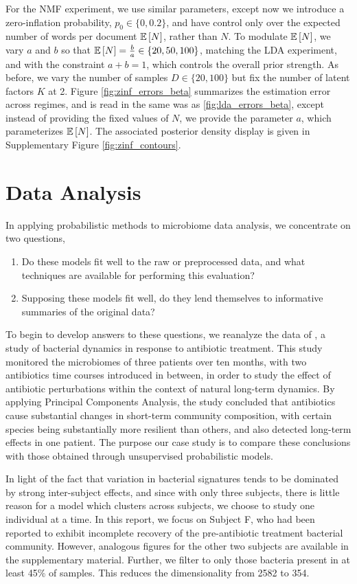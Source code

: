 \documentclass[oupdraft]{bio}
\begin{document}
For the NMF experiment, we use similar parameters, except now we introduce a
zero-inflation probability, $p_{0} \in \{0, 0.2\}$, and have control only over
the expected number of words per document $\mathbb{E}\left[{N}\right]$, rather than $N$. To
modulate $\mathbb{E}\left[{N}\right]$, we vary $a$ and $b$ so that $\mathbb{E}\left[{N}\right] = \frac{b}{a} \in
\{20, 50, 100\}$, matching the LDA experiment, and with the constraint $a + b =
1$, which controls the overall prior strength. As before, we vary the number of
samples $D \in \{20, 100\}$ but fix the number of latent factors $K$ at 2.
Figure \ref{fig:zinf_errors_beta} summarizes the estimation error across
regimes, and is read in the same was as \ref{fig:lda_errors_beta}, except
instead of providing the fixed values of $N$, we provide the parameter $a$,
which parameterizes $\mathbb{E}\left[{N}\right]$. The associated posterior density display is
given in Supplementary Figure \ref{fig:zinf_contours}.

\section{Data Analysis}

In applying probabilistic methods to microbiome data analysis, we concentrate on
two questions,
\begin{enumerate}
\item Do these models fit well to the raw or preprocessed data, and what techniques
are available for performing this evaluation?
\item Supposing these models fit well, do they lend themselves to informative
summaries of the original data?
\end{enumerate}

To begin to develop answers to these questions, we reanalyze the data of
\citep{dethlefsen2011incomplete}, a study of bacterial dynamics in response to
antibiotic treatment. This study monitored the microbiomes of three patients
over ten months, with two antibiotics time courses introduced in between, in
order to study the effect of antibiotic perturbations within the context of
natural long-term dynamics. By applying Principal Components Analysis, the study
concluded that antibiotics cause substantial changes in short-term community
composition, with certain species being substantially more resilient than
others, and also detected long-term effects in one patient. The purpose our case
study is to compare these conclusions with those obtained through unsupervised
probabilistic models.

In light of the fact that variation in bacterial signatures tends to be
dominated by strong inter-subject effects, and since with only three subjects,
there is little reason for a model which clusters across subjects, we choose to
study one individual at a time. In this report, we focus on Subject F, who had
been reported to exhibit incomplete recovery of the pre-antibiotic treatment
bacterial community. However, analogous figures for the other two subjects are
available in the supplementary material. Further, we filter to only those
bacteria present in at least 45\% of samples. This reduces the dimensionality
from 2582 to 354.
\end{document}
